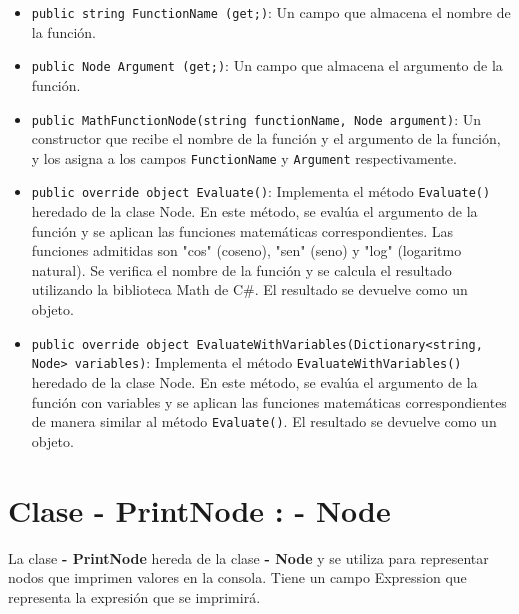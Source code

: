 \documentclass{article}
\newcommand{\subclassed}[1]{\textcolor{classcolor}{\textbf{- #1}}}
\begin{document}
\begin{itemize}
    \item \lstinline{public string FunctionName (get;)}: Un campo que almacena el nombre de la función.

    \item \lstinline{public Node Argument (get;)}: Un campo que almacena el argumento de la función.

    \item \lstinline{public MathFunctionNode(string functionName, Node argument)}: Un constructor que recibe el nombre de la función y el argumento de la función, y los asigna a los campos \lstinline{FunctionName} y \lstinline{Argument} respectivamente.

    \item \lstinline{public override object Evaluate()}: Implementa el método \lstinline{Evaluate()} heredado de la clase \textcolor{classcolor}{Node}. En este método, se evalúa el argumento de la función y se aplican las funciones matemáticas correspondientes. Las funciones admitidas son "cos" (coseno), "sen" (seno) y "log" (logaritmo natural). Se verifica el nombre de la función y se calcula el resultado utilizando la biblioteca Math de C\#. El resultado se devuelve como un objeto.

    \item \lstinline{public override object EvaluateWithVariables(Dictionary<string, Node> variables)}: Implementa el método \lstinline{EvaluateWithVariables()} heredado de la clase \textcolor{classcolor}{Node}. En este método, se evalúa el argumento de la función con variables y se aplican las funciones matemáticas correspondientes de manera similar al método \lstinline{Evaluate()}. El resultado se devuelve como un objeto.
\end{itemize}
\section{Clase \subclassed{PrintNode} : \subclassed{Node}}

La clase \subclassed{PrintNode} hereda de la clase \subclassed{Node} y se utiliza para representar nodos que imprimen valores en la consola. Tiene un campo \textcolor{fieldcolor}{Expression} que representa la expresión que se imprimirá.
\end{document}
